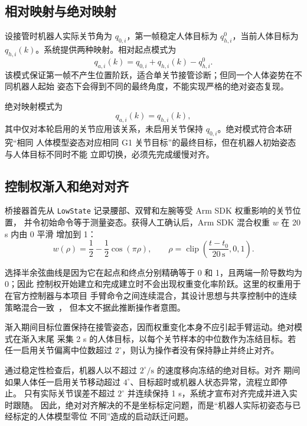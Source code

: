 \subsection{相对映射与绝对映射}
\label{subsec:ch5_relative_absolute_mapping}

设接管时机器人实际关节角为 $q_{0,i}$，第一帧稳定人体目标为 $q_{h,i}^0$，当前人体目标为
$q_{h,i}(k)$。系统提供两种映射。相对起点模式为
\begin{equation}
  q_{a,i}(k)=q_{0,i}+q_{h,i}(k)-q_{h,i}^0.
  \label{eq:ch5_relative_mapping}
\end{equation}
该模式保证第一帧不产生位置阶跃，适合单关节接管诊断；但同一个人体姿势在不同机器人起始
姿态下会得到不同的最终角度，不能实现严格的绝对姿态复现。

绝对映射模式为
\begin{equation}
  q_{a,i}(k)=q_{h,i}(k),
  \label{eq:ch5_absolute_mapping}
\end{equation}
其中仅对本轮启用的关节应用该关系，未启用关节保持 $q_{0,i}$。绝对模式符合本研究“相同
人体模型姿态对应相同 G1 关节目标”的最终目标，但在机器人初始姿态与人体目标不同时不能
立即切换，必须先完成缓慢对齐。

\subsection{控制权渐入和绝对对齐}
\label{subsec:ch5_smooth_takeover_alignment}

桥接器首先从 \texttt{LowState} 记录腰部、双臂和左腕等受 Arm SDK 权重影响的关节位置，
并令初始命令等于测量姿态。获得人工确认后，Arm SDK 混合权重 $w$ 在 20 s 内由 0 平滑
增加到 1：
\begin{equation}
  w(\rho)=\frac{1}{2}-\frac{1}{2}\cos(\pi\rho),\qquad
  \rho=\operatorname{clip}\left(
  \frac{t-t_0}{20\,\mathrm s},0,1\right).
  \label{eq:ch5_takeover_weight}
\end{equation}

选择半余弦曲线是因为它在起点和终点分别精确等于 0 和 1，且两端一阶导数均为 0；因此
控制权开始建立和完成建立时不会出现权重变化率阶跃。这里的权重用于在官方控制器与本项目
手臂命令之间连续混合，其设计思想与共享控制中的连续策略混合一致~\cite{dragan2013policy}，
但本文不据此推断操作者意图。

渐入期间目标位置保持在接管姿态，因而权重变化本身不应引起手臂运动。绝对模式在渐入末尾
采集 2 s 的人体目标，以每个关节样本的中位数作为冻结目标。若任一启用关节偏离中位数超过
$2^\circ$，则认为操作者没有保持静止并终止对齐。

通过稳定性检查后，机器人以不超过 $2^\circ/\mathrm s$ 的速度移向冻结的绝对目标。对齐
期间如果人体任一启用关节移动超过 $4^\circ$、目标超时或机器人状态异常，流程立即停止。
只有实际关节误差不超过 $2^\circ$ 并连续保持 1 s，系统才宣布对齐完成并进入实时跟随。
因此，绝对对齐解决的不是坐标标定问题，而是“机器人实际初姿态与已经标定的人体模型零位
不同”造成的启动跃迁问题。

